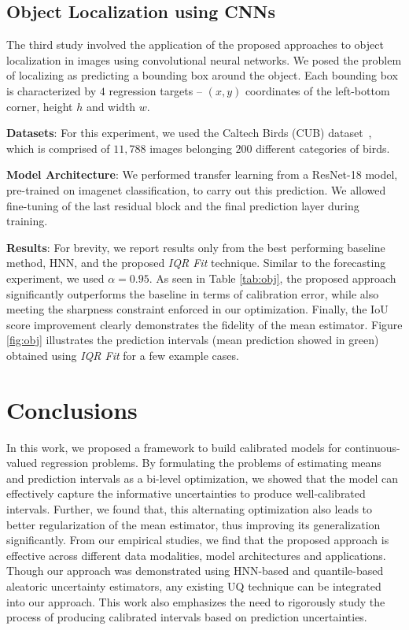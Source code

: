 \documentclass[letterpaper]{article} %
\begin{document}
\subsection{Object Localization using CNNs}
The third study  involved the application of the proposed approaches to object localization in images using convolutional neural networks. We posed the problem of localizing as predicting a bounding box around the object. Each bounding box is characterized by $4$ regression targets -- $(x,y)$ coordinates of the left-bottom corner, height $h$ and width $w$.

\noindent \textbf{Datasets}: For this experiment, we used the Caltech Birds (CUB) dataset~\cite{WelinderEtal2010CUB}, which is comprised of $11,788$ images belonging $200$ different categories of birds.

\noindent \textbf{Model Architecture}: We performed transfer learning from a ResNet-18 model, pre-trained on imagenet classification, to carry out this prediction. We allowed fine-tuning of the last residual block and the final prediction layer during training.

\noindent \textbf{Results}: For brevity, we report results only from the best performing baseline method, HNN, and the proposed \textit{IQR Fit} technique. Similar to the forecasting experiment, we used $\alpha = 0.95$. As seen in Table \ref{tab:obj}, the proposed approach significantly outperforms the baseline in terms of calibration error, while also meeting the sharpness constraint enforced in our optimization. Finally, the IoU score improvement clearly demonstrates the fidelity of the mean estimator. Figure \ref{fig:obj} illustrates the prediction intervals (mean prediction showed in green) obtained using \textit{IQR Fit} for a few example cases.

\section{Conclusions}
In this work, we proposed a framework to build calibrated models for continuous-valued regression problems. By formulating the problems of estimating means and prediction intervals as a bi-level optimization, we showed that the model can effectively capture the informative uncertainties to produce well-calibrated intervals. Further, we found that, this alternating optimization also leads to better regularization of the mean estimator, thus improving its generalization significantly. From our empirical studies, we find that the proposed approach is effective across different data modalities, model architectures and applications. Though our approach was demonstrated using HNN-based and quantile-based aleatoric uncertainty estimators, any existing UQ technique can be integrated into our approach. This work also emphasizes the need to rigorously study the process of producing calibrated intervals based on prediction uncertainties.



\end{document}

